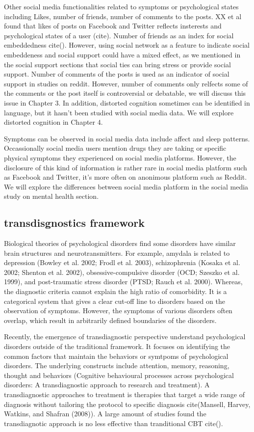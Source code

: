 Other social media functionalities related to symptoms or psychological states including Likes, number of friends, number of comments to the posts. XX et al found that likes of posts on Facebook and Twitter reflects insterests and psychological states of a user (cite). Number of friends as an index for social embeddedness cite(). However, using social network as a feature to indicate social embeddeness and social support could have a mixed effect, as we mentioned in the social support sections that social ties can bring stress or provide social support. Number of comments of the posts is used as an indicator of social support in studies on reddit. However, number of comments only relfects some of the comments or the post itself is controversial or debatable, we will discuss this issue in Chapter 3. In addition, distorted cognition sometimes can be identified in language, but it hasn't been studied with social media data. We will explore distorted cognition in Chapter 4. 

Symptoms can be observed in social media data include affect and sleep patterns. Occassionally social media users mention drugs they are taking or specific physical symptoms they experienced on social media platforms. However, the disclosure of this kind of information is rather rare in social media platform such as Facebook and Twitter, it's more often on anonimous platform such as Reddit. We will explore the differences between social media platform in the social media study on mental health section.


\subsection{transdisgnostics framework}

Biological theories of psychological disorders find some disorders have similar brain structures and neurotransmitters. For example, amydala is related to depression (Bowley et al. 2002; Frodl et al. 2003), schizophrenia (Kosaka et al. 2002; Shenton et al. 2002), obsessive-compulsive disorder (OCD; Szeszko et al. 1999), and post-traumatic stress disorder (PTSD; Rauch et al. 2000). Whereas, the diagnostic criteria cannot explain the high ratio of comorbidity. It is a categorical system that gives a clear cut-off line to disorders based on the observation of symptoms. However, the symptoms of various disorders often overlap, which result in arbitrarily defined boundaries of the disorders. 

Recently, the emergence of transdiagnostic perspective understand psychological disorders outside of the traditional framework. It focuses on identifying the common factors that maintain the behaviors or symtpoms of psychological disorders. The underlying constructs include attention, memory, reasoning, thought and behaviors (Cognitive behavioural processes across psychological disorders: A transdiagnostic approach to research and treatment). A transdiagnostic approaches to treatment is therapies that target a wide range of diagnosis without tailoring the protocol to specific diagnosis cite(Mansell, Harvey, Watkins, and Shafran (2008)). A large amount of studies found the transdiagnotic approach is no less effective than tranditional CBT cite().

